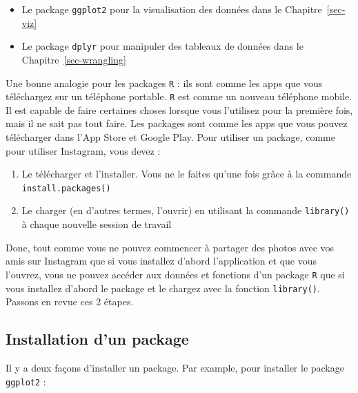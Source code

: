\documentclass[
  letterpaper,
  DIV=11,
  numbers=noendperiod]{scrreprt}
\providecommand{\tightlist}{%
  \setlength{\itemsep}{0pt}\setlength{\parskip}{0pt}}\usepackage{longtable,booktabs,array}
\begin{document}
\begin{itemize}
\tightlist
\item
  Le package \texttt{ggplot2} pour la visualisation des données dans le
  Chapitre~\ref{sec-viz}
\item
  Le package \texttt{dplyr} pour manipuler des tableaux de données dans
  le Chapitre~\ref{sec-wrangling}
\end{itemize}

Une bonne analogie pour les packages \texttt{R} : ils sont comme les
apps que vous téléchargez sur un téléphone portable. \texttt{R} est
comme un nouveau téléphone mobile. Il est capable de faire certaines
choses lorsque vous l'utilisez pour la première fois, mais il ne sait
pas tout faire. Les packages sont comme les apps que vous pouvez
télécharger dans l'App Store et Google Play. Pour utiliser un package,
comme pour utiliser Instagram, vous devez :

\begin{enumerate}
\def\labelenumi{\arabic{enumi}.}
\tightlist
\item
  Le télécharger et l'installer. Vous ne le faites qu'une fois grâce à
  la commande \texttt{install.packages()}
\item
  Le charger (en d'autres termes, l'ouvrir) en utilisant la commande
  \texttt{library()} à chaque nouvelle session de travail
\end{enumerate}

Donc, tout comme vous ne pouvez commencer à partager des photos avec vos
amis sur Instagram que si vous installez d'abord l'application et que
vous l'ouvrez, vous ne pouvez accéder aux données et fonctions d'un
package \texttt{R} que si vous installez d'abord le package et le
chargez avec la fonction \texttt{library()}. Passons en revue ces 2
étapes.

\hypertarget{installation-dun-package}{%
\subsection{Installation d'un package}\label{installation-dun-package}}

Il y a deux façons d'installer un package. Par example, pour installer
le package \texttt{ggplot2} :
\end{document}
